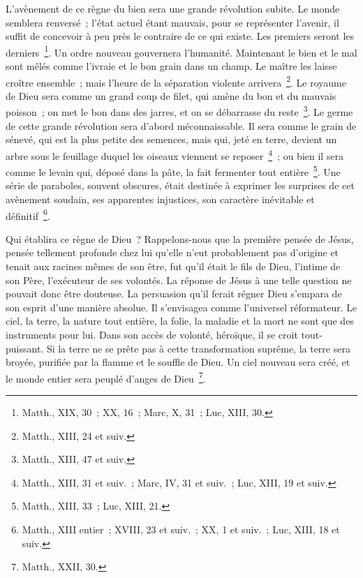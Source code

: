 \documentclass[french,twoside]{book} %
\begin{document}
L’avènement de ce règne du bien sera une grande révolution subite. Le monde semblera renversé ; l’état actuel étant mauvais, pour se représenter l’avenir, il suffit de concevoir à peu près le contraire de ce qui existe. Les premiers seront les derniers \footnote{Matth., XIX, 30 ; XX, 16 ; Marc, X, 31 ; Luc, XIII, 30.}. Un ordre nouveau gouvernera l’humanité. Maintenant le bien et le mal sont mêlés comme l’ivraie et le bon grain dans un champ. Le maître les laisse croître ensemble ; mais l’heure de la séparation violente arrivera \footnote{Matth., XIII, 24 et suiv.}. Le royaume de Dieu sera comme un grand coup de filet, qui amène du bon et du mauvais poisson ; on met le bon dans des jarres, et on se débarrasse du reste \footnote{Matth., XIII, 47 et suiv.}. Le germe de cette grande révolution sera d’abord méconnaissable. Il sera comme le grain de sénevé, qui est la plus petite des semences, mais qui, jeté en terre, devient un arbre sous le feuillage duquel les oiseaux viennent se reposer \footnote{Matth., XIII, 31 et suiv. ; Marc, IV, 31 et suiv. ; Luc, XIII, 19 et suiv.} ; ou bien il sera comme le levain qui, déposé dans la pâte, la fait fermenter tout entière \footnote{Matth., XIII, 33 ; Luc, XIII, 21.}. Une série de paraboles, souvent obscures, était destinée à exprimer les surprises de cet avènement soudain, ses apparentes injustices, son caractère inévitable et définitif \footnote{Matth., XIII entier ; XVIII, 23 et suiv. ; XX, 1 et suiv. ; Luc, XIII, 18 et suiv.}.\par
Qui établira ce règne de Dieu ? Rappelons-nous que la première pensée de Jésus, pensée tellement profonde chez lui qu’elle n’eut probablement pas d’origine et tenait aux racines mêmes de son être, fut qu’il était le fils de Dieu, l’intime de son Père, l’exécuteur de ses volontés. La réponse de Jésus à une telle question ne pouvait donc être douteuse. La persuasion qu’il ferait régner Dieu s’empara de son esprit d’une manière absolue. Il s’envisagea comme l’universel réformateur. Le ciel, la terre, la nature tout entière, la folie, la maladie et la mort ne sont que des instruments pour lui. Dans son accès de volonté, héroïque, il se croit tout-puissant. Si la terre ne se prête pas à cette transformation suprême, la terre sera broyée, purifiée par la flamme et le souffle de Dieu. Un ciel nouveau sera créé, et le monde entier sera peuplé d’anges de Dieu \footnote{Matth., XXII, 30.}.\par
\end{document}
